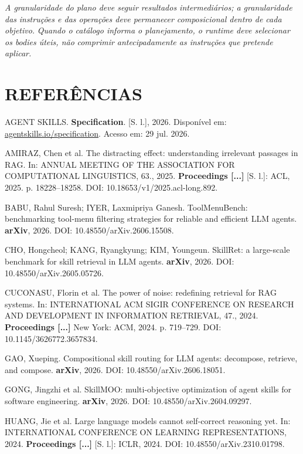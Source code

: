 \documentclass[12pt,a4paper]{article}
\begin{document}

\textit{A granularidade do plano deve seguir resultados intermediários; a granularidade das} \textit{instruções e das operações deve permanecer composicional dentro de cada objetivo.} \textit{Quando o catálogo informa o planejamento, o runtime deve selecionar os bodies úteis, não} \textit{comprimir antecipadamente as instruções que pretende aplicar.}


\section*{REFERÊNCIAS}

AGENT SKILLS. \textbf{Specification}. [S. l.], 2026. Disponível em: \href{https://agentskills.io/specification}{agentskills.io/specification}. Acesso em: 29 jul. 2026.

AMIRAZ, Chen et al. The distracting effect: understanding irrelevant passages in RAG. In: ANNUAL MEETING OF THE ASSOCIATION FOR COMPUTATIONAL LINGUISTICS, 63., 2025. \textbf{Proceedings [...]} [S. l.]: ACL, 2025. p. 18228--18258. DOI: 10.18653/v1/2025.acl-long.892.

BABU, Rahul Suresh; IYER, Laxmipriya Ganesh. ToolMenuBench: benchmarking tool-menu filtering strategies for reliable and efficient LLM agents. \textbf{arXiv}, 2026. DOI: 10.48550/arXiv.2606.15508.

CHO, Hongcheol; KANG, Ryangkyung; KIM, Youngeun. SkillRet: a large-scale benchmark for skill retrieval in LLM agents. \textbf{arXiv}, 2026. DOI: 10.48550/arXiv.2605.05726.

CUCONASU, Florin et al. The power of noise: redefining retrieval for RAG systems. In: INTERNATIONAL ACM SIGIR CONFERENCE ON RESEARCH AND DEVELOPMENT IN INFORMATION RETRIEVAL, 47., 2024. \textbf{Proceedings [...]} New York: ACM, 2024. p. 719--729. DOI: 10.1145/3626772.3657834.

GAO, Xueping. Compositional skill routing for LLM agents: decompose, retrieve, and compose. \textbf{arXiv}, 2026. DOI: 10.48550/arXiv.2606.18051.

GONG, Jingzhi et al. SkillMOO: multi-objective optimization of agent skills for software engineering. \textbf{arXiv}, 2026. DOI: 10.48550/arXiv.2604.09297.

HUANG, Jie et al. Large language models cannot self-correct reasoning yet. In: INTERNATIONAL CONFERENCE ON LEARNING REPRESENTATIONS, 2024. \textbf{Proceedings [...]} [S. l.]: ICLR, 2024. DOI: 10.48550/arXiv.2310.01798.
\end{document}
